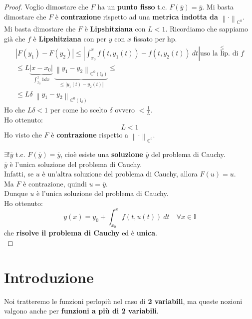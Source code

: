 \documentclass[a4paper, oneside]{article}
\newcommand\norma{\left\lVert\cdot\right\rVert}
\newcommand\C{\mathbb{C}}
\newcommand\I{\mathbb{I}}
\begin{document}
\begin{theorem}
\begin{proof}
        \noindent Voglio dimostare che $F$ ha un \textbf{punto fisso} t.c. $F(\overline{y}) = \overline{y}$. 
        Mi basta dimostare che $F$ è \textbf{contrazione} rispetto ad una \textbf{metrica indotta da} $\norma_{\C^0}$.\\
        Mi basta dimostare che $F$ è \textbf{Lipshitziana} con $L<1$. Ricordiamo che sappiamo già che $f$ è \textbf{Lipshitziana} con per $y$ con $x$ fissato per hp.
        \begin{gather*}
            \left|F(y_1) - F(y_2)\right| \leq \left|\int_{x_0}^{x} f\left(t,y_1(t)\right) - f\left(t,y_2(t)\right) \ dt\right| \overset{\leq}{\text{uso la lip. di $f$}}\\
            \leq L \underbrace{|x-x_0|}_{\int_{x_0}^x 1 dx} \  \underbrace{\left\lVert y_1-y_2\right\rVert_{\C^0(\I_\delta)}}_{\leq |y_1(t)-y_2(t)|} \leq \\
            \leq L\delta \ \left\lVert y_1-y_2\right\rVert_{\C^0(\I_\delta)}
        \end{gather*}
        Ho che $L\delta < 1$ per come ho scelto $\delta$ ovvero $< \frac{1}{L}$.\\ 
        Ho ottenuto:
        \[L<1\]
        Ho visto che $F$ è \textbf{contrazione} rispetto a $\norma_{\C^0}$.
        
        \noindent $\exists!\overline{y}$ t.c. $F(\overline{y}) = \overline{y}$, cioè esiste una \textbf{soluzione} $\overline{y}$ del problema di Cauchy.\\
         $\overline{y}$ è l'unica soluzione del problema di Cauchy.\\
         Infatti, se $u$ è un'altra soluzione del problema di Cauchy, allora $F(u) = u$.\\
         Ma $F$ è contrazione, quindi $u = \overline{y}$.\\
         Dunque $u$ è l'unica soluzione del problema di Cauchy.\\
          Ho ottenuto:
        \[y(x) = y_0 + \int_{x_0}^{x} f\left(t,u(t)\right) \ dt \quad\forall x\in\I\]
        che \textbf{risolve il problema di Cauchy} ed è \textbf{unica}.\\
    \end{proof}
\end{theorem}
    \newpage

    \section{Introduzione}
    Noi tratteremo le funzioni perlopiù nel caso di \textbf{2 variabili}, ma queste nozioni valgono 
    anche per \textbf{funzioni a più di 2 variabili}.
\end{document}
